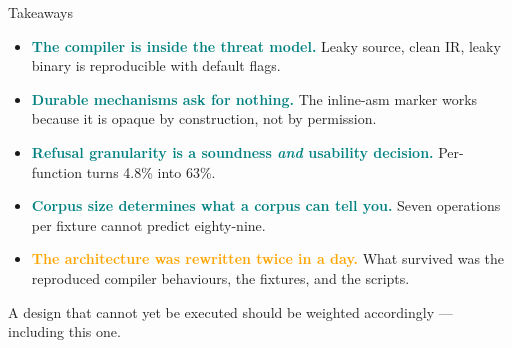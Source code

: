 \documentclass[aspectratio=169,10pt]{beamer}
\newcommand{\good}[1]{\textcolor{Teal}{\textbf{#1}}}
\newcommand{\bad}[1]{\textcolor{Orange}{\textbf{#1}}}
\begin{document}
\begin{frame}{Takeaways}
  \begin{itemize}
    \item \good{The compiler is inside the threat model.} Leaky source, clean IR,
          leaky binary is reproducible with default flags.
    \item \good{Durable mechanisms ask for nothing.} The inline-asm marker works
          because it is opaque by construction, not by permission.
    \item \good{Refusal granularity is a soundness \emph{and} usability decision.}
          Per-function turns 4.8\% into 63\%.
    \item \good{Corpus size determines what a corpus can tell you.} Seven
          operations per fixture cannot predict eighty-nine.
    \item \bad{The architecture was rewritten twice in a day.} What survived was
          the reproduced compiler behaviours, the fixtures, and the scripts.
  \end{itemize}

  \vspace{0.6em}
  \begin{block}{}
  \centering
  A design that cannot yet be executed should be weighted accordingly ---
  including this one.
  \end{block}
\end{frame}
\end{document}
